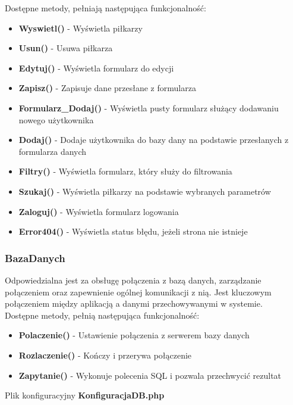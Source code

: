    Dostępne metody, pełniają następująca funkcjonalność: 
    \begin{itemize}
        \item \textbf{Wyswietl()} - Wyświetla piłkarzy
        \item \textbf{Usun()} - Usuwa piłkarza
        \item \textbf{Edytuj()} - Wyświetla formularz do edycji
        \item \textbf{Zapisz()} - Zapisuje dane przesłane z formularza
        \item \textbf{Formularz\_Dodaj()} - Wyświetla pusty formularz służący dodawaniu nowego użytkownika
        \item \textbf{Dodaj()} - Dodaje użytkownika do bazy dany na podstawie przesłanych z formularza danych
        \item \textbf{Filtry()} - Wyświetla formularz, który służy do filtrowania
        \item \textbf{Szukaj()} - Wyświetla piłkarzy na podstawie wybranych parametrów
        \item \textbf{Zaloguj()} - Wyświetla formularz logowania
        \item \textbf{Error404()} - Wyświetla status błędu, jeżeli strona nie istnieje
    \end{itemize}
      


    \subsubsection{BazaDanych}
    Odpowiedzialna jest za obsługę połączenia z bazą danych, zarządzanie połączeniem  oraz zapewnienie ogólnej komunikacji z nią. Jest kluczowym połączeniem między aplikacją a danymi przechowywanymi w systemie.\\
    Dostępne metody, pełnią następująca funkcjonalność: 
    \begin{itemize}
        \item \textbf{Polaczenie()} - Ustawienie połączenia z serwerem bazy danych
        \item \textbf{Rozlaczenie()} - Kończy i przerywa połączenie
        \item \textbf{Zapytanie()} - Wykonuje polecenia SQL i pozwala przechwycić rezultat
    \end{itemize}
    Plik konfiguracyjny \textbf{KonfiguracjaDB.php}
     
     


